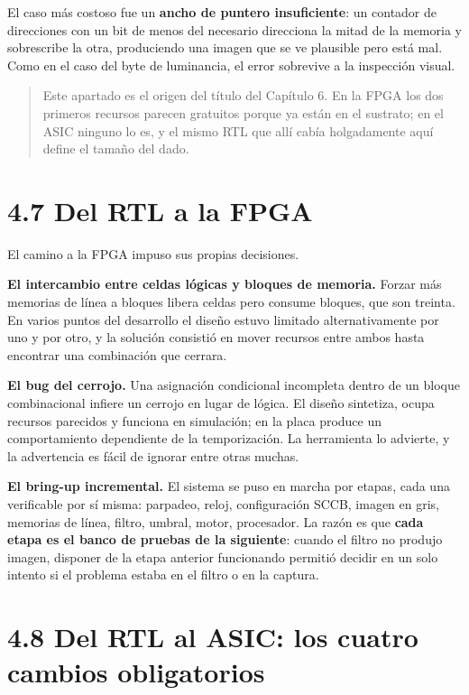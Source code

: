 El caso más costoso fue un \textbf{ancho de puntero insuficiente}: un
contador de direcciones con un bit de menos del necesario direcciona la
mitad de la memoria y sobrescribe la otra, produciendo una imagen que se
ve plausible pero está mal. Como en el caso del byte de luminancia, el
error sobrevive a la inspección visual.

\begin{quote}
Este apartado es el origen del título del Capítulo 6. En la FPGA los dos
primeros recursos parecen gratuitos porque ya están en el sustrato; en
el ASIC ninguno lo es, y el mismo RTL que allí cabía holgadamente aquí
define el tamaño del dado.
\end{quote}

\section{4.7 Del RTL a la FPGA}\label{del-rtl-a-la-fpga}

El camino a la FPGA impuso sus propias decisiones.

\textbf{El intercambio entre celdas lógicas y bloques de memoria.}
Forzar más memorias de línea a bloques libera celdas pero consume
bloques, que son treinta. En varios puntos del desarrollo el diseño
estuvo limitado alternativamente por uno y por otro, y la solución
consistió en mover recursos entre ambos hasta encontrar una combinación
que cerrara.

\textbf{El bug del cerrojo.} Una asignación condicional incompleta
dentro de un bloque combinacional infiere un cerrojo en lugar de lógica.
El diseño sintetiza, ocupa recursos parecidos y funciona en simulación;
en la placa produce un comportamiento dependiente de la temporización.
La herramienta lo advierte, y la advertencia es fácil de ignorar entre
otras muchas.

\textbf{El bring-up incremental.} El sistema se puso en marcha por
etapas, cada una verificable por sí misma: parpadeo, reloj,
configuración SCCB, imagen en gris, memorias de línea, filtro, umbral,
motor, procesador. La razón es que \textbf{cada etapa es el banco de
pruebas de la siguiente}: cuando el filtro no produjo imagen, disponer
de la etapa anterior funcionando permitió decidir en un solo intento si
el problema estaba en el filtro o en la captura.

\section{4.8 Del RTL al ASIC: los cuatro cambios
obligatorios}\label{del-rtl-al-asic-los-cuatro-cambios-obligatorios}

